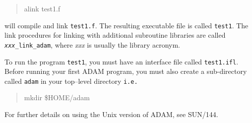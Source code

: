 \begin{quote}\tt

alink test1.f

\end{quote}

will compile and link {\tt test1.f}. The resulting executable file is
called {\tt test1}. The link procedures for linking with additional
subroutine libraries
are called {\tt{\em xxx}\_link\_adam}, where {\em xxx\/} is usually
the library acronym.

To run the program {\tt test1}, you must have an interface file called
{\tt test1.ifl}.
Before running your first ADAM program, you must also create a sub-directory
called {\tt adam} in your top--level directory {\tt i.e.}

\begin{quote}\tt

mkdir \$HOME/adam

\end{quote}

For further details on using the Unix version of ADAM, see SUN/144.



